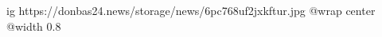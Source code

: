  
 
 
 
 

\ifcmt
  ig https://donbas24.news/storage/news/6pc768uf2jxkftur.jpg
  @wrap center
  @width 0.8
\fi
